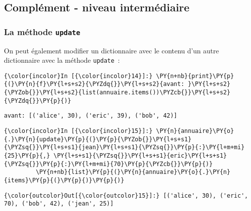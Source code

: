 \newpage

    \hypertarget{compluxe9ment---niveau-intermuxe9diaire}{%
\subsection{Complément - niveau
intermédiaire}\label{compluxe9ment---niveau-intermuxe9diaire}}

    \hypertarget{la-muxe9thode-update}{%
\subsubsection{\texorpdfstring{La méthode
\texttt{update}}{La méthode update}}\label{la-muxe9thode-update}}

    On peut également modifier un dictionnaire avec le contenu d'un autre
dictionnaire avec la méthode \texttt{update}~:

    \begin{Verbatim}[commandchars=\\\{\}]
{\color{incolor}In [{\color{incolor}14}]:} \PY{n+nb}{print}\PY{p}{(}\PY{n}{f}\PY{l+s+s2}{\PYZdq{}}\PY{l+s+s2}{avant: }\PY{l+s+s2}{\PYZob{}}\PY{l+s+s2}{list(annuaire.items())\PYZcb{}}\PY{l+s+s2}{\PYZdq{}}\PY{p}{)}
\end{Verbatim}


    \begin{Verbatim}[commandchars=\\\{\}]
avant: [('alice', 30), ('eric', 39), ('bob', 42)]

    \end{Verbatim}

    \begin{Verbatim}[commandchars=\\\{\}]
{\color{incolor}In [{\color{incolor}15}]:} \PY{n}{annuaire}\PY{o}{.}\PY{n}{update}\PY{p}{(}\PY{p}{\PYZob{}}\PY{l+s+s1}{\PYZsq{}}\PY{l+s+s1}{jean}\PY{l+s+s1}{\PYZsq{}}\PY{p}{:}\PY{l+m+mi}{25}\PY{p}{,} \PY{l+s+s1}{\PYZsq{}}\PY{l+s+s1}{eric}\PY{l+s+s1}{\PYZsq{}}\PY{p}{:}\PY{l+m+mi}{70}\PY{p}{\PYZcb{}}\PY{p}{)}
         \PY{n+nb}{list}\PY{p}{(}\PY{n}{annuaire}\PY{o}{.}\PY{n}{items}\PY{p}{(}\PY{p}{)}\PY{p}{)}
\end{Verbatim}


\begin{Verbatim}[commandchars=\\\{\}]
{\color{outcolor}Out[{\color{outcolor}15}]:} [('alice', 30), ('eric', 70), ('bob', 42), ('jean', 25)]
\end{Verbatim}
            
